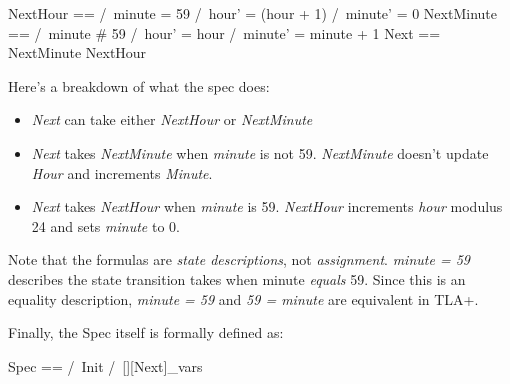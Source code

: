 \begin{tla}
    NextHour ==
        /\ minute = 59 
        /\ hour' = (hour + 1) %
        /\ minute' = 0
    NextMinute == 
        /\ minute # 59
        /\ hour' = hour 
        /\ minute' = minute + 1 
    Next ==
        \/ NextMinute
        \/ NextHour
\end{tla}
\begin{tlatex}
%
%
%
%
%
%
%
%
%
%
%
\end{tlatex}
 \newline

Here's a breakdown of what the spec does:
\begin{itemize}
    \item \textit{Next} can take either \textit{NextHour} or \textit{NextMinute}
    \item \textit{Next} takes \textit{NextMinute} when \textit{minute} is not
    59. \textit{NextMinute} doesn't update \textit{Hour} and increments \textit{Minute}.
    \item \textit{Next} takes \textit{NextHour} when \textit{minute} is 59.
    \textit{NextHour} increments \textit{hour} modulus 24 and sets \textit{minute} to 0.
\end{itemize}

Note that the formulas are \textit{state descriptions}, not \textit{assignment}.
\textit{minute = 59} describes the state transition takes when minute
\textit{equals} 59. Since this is an equality description, \textit{minute = 59}
and \textit{59 = minute} are equivalent in TLA+.\newline

Finally, the Spec itself is formally defined as:\newline
\begin{tla}
    Spec ==
        /\ Init
        /\ [][Next]_vars
\end{tla}
\begin{tlatex}
%
%
%
%
\end{tlatex}
\newline


